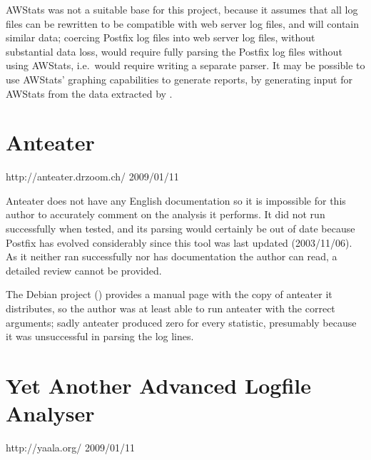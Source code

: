 AWStats was not a suitable base for this project, because it assumes that
all log files can be rewritten to be compatible with web server log files,
and will contain similar data; coercing Postfix log files into web server
log files, without substantial data loss, would require fully parsing the
Postfix log files without using AWStats, i.e.\ would require writing a
separate parser.  It may be possible to use AWStats' graphing capabilities
to generate reports, by generating input for AWStats from the data
extracted by \parsername{}.

\section{Anteater}

{http://anteater.drzoom.ch/}
{2009/01/11}

Anteater does not have any English documentation so it is impossible for
this author to accurately comment on the analysis it performs.  It did not
run successfully when tested, and its parsing would certainly be out of
date because Postfix has evolved considerably since this tool was last
updated (2003/11/06).  As it neither ran successfully nor has documentation
the author can read, a detailed review cannot be provided.

The Debian project ()
provides a manual page with the copy of anteater it distributes, so the
author was at least able to run anteater with the correct arguments; sadly
anteater produced zero for every statistic, presumably because it was
unsuccessful in parsing the log lines.

\section{Yet Another Advanced Logfile Analyser}

{http://yaala.org/}
{2009/01/11}

